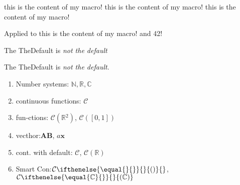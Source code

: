 \documentclass{article}
\newcommand{\mymacro}{this is the content of my macro!}
\newcommand{\macroWithArgs}[2]{Applied to #1 and #2!}
\newcommand{\macroWithDefault}[2][TheDefault]{The TheDefault is #2}
\newcommand{\numN}{\mathbb{N}}
\newcommand{\numR}{\mathbb{R}}
\newcommand{\numC}{\mathbb{C}}
\newcommand{\cont}{\mathcal{C}}
\newcommand{\vect}[1]{\mathbf{#1}}
\newcommand{\contOn}[1]{\cont{(#1)}}
\newcommand{\contDef}[1][{}]{\cont{}#1}
\newcommand{\smartCont}[1][{}]{
    \cont{}
\ifthenelse{\equal{#1}{}}
{} 
{(#1)}
}
\begin{document}
\mymacro{} \mymacro{} \mymacro{}

\macroWithArgs{\mymacro}{42}

\macroWithDefault{\emph{not the default}}

\macroWithDefault[\textbf{overriden by the argumant}]%
{\emph{not the default}}.
\begin{enumerate}
    \item Number systems: $\numN, \numR, \numC$
    \item continuous functions: $\cont{}$
    \item fun-ctions: $\contOn{\numR{}^2}$, $\contOn{[0,1]}$
    \item vecthor:$\vect{AB}$, $a \vect{x}$
    \item cont. with default: $\contDef$, $\contDef[(\numR)]$
    \item Smart Con:$\smartCont{}$, $\smartCont[\numC]$
\end{enumerate}
\end{document}
